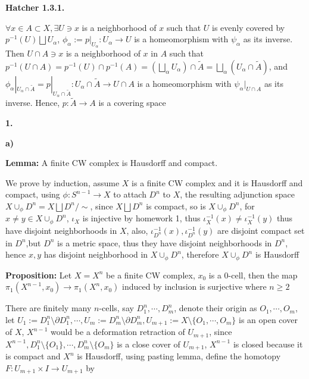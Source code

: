 \documentclass[../main.tex]{subfiles}
\begin{document}
\textbf{Hatcher 1.3.1.} \par
$\forall x\in A\subset X, \exists U\ni x$ is a neighborhood of $x$ such that $U$ is evenly covered by $p^{-1}(U)\bigsqcup U_{\alpha}$, $\phi_{\alpha}:=p|_{U_{\alpha}}:U_{\alpha}\rightarrow U$ is a homeomorphism with $\psi_{\alpha}$ as its inverse. Then $U\cap A\ni x$ is a neighborhood of $x$ in $A$ such that $\displaystyle{p^{-1}(U\cap A)=p^{-1}(U)\cap p^{-1}(A)=\left(\underset{\alpha}{\bigsqcup}U_{\alpha}\right)\cap \widetilde{A}}=\underset{\alpha}{\bigsqcup}\left(U_{\alpha}\cap \widetilde{A}\right)$, and $\phi_{\alpha}|_{U_{\alpha}\cap \widetilde{A}}=p|_{U_{\alpha}\cap \widetilde{A}}: U_{\alpha}\cap \widetilde{A}\rightarrow U\cap A$ is a homeomorphism with $\psi_{\alpha}|_{U\cap A}$ as its inverse. Hence, $p: \widetilde{A}\rightarrow A$ is a covering space \par
\textbf{1.} \par
\textbf{a)} \par
\textbf{Lemma:} A finite CW complex is Hausdorff and compact. \par
We prove by induction, assume $X$ is a finite CW complex and it is Hausdorff and compact, using $\phi: S^{n-1}\rightarrow X$ to attach $D^{n}$ to $X$, the resulting adjunction space $X\cup_{\phi}D^{n}=X\bigsqcup D^{n} /\sim$, since $X\bigsqcup D^{n}$ is compact, so is $X\cup_{\phi}D^{n}$, for $x\neq y\in X\cup_{\phi}D^{n}$, $\iota_{X}$ is injective by homework 1, thus $\iota_{X}^{-1}(x)\neq\iota_{X}^{-1}(y)$ thus have disjoint neighborhoods in $X$, also, $\iota_{D^{n}}^{-1}(x),\iota_{D^{n}}^{-1}(y)$ are disjoint compact set in $D^{n}$,but $D^{n}$ is a metric space, thus they have disjoint neighborhoods in $D^{n}$, hence $x,y$ has disjoint neighborhood in $X\cup_{\phi}D^{n}$, therefore $X\cup_{\phi}D^{n}$ is Hausdorff
\begin{center}
\end{center}
\textbf{Proposition:} Let $X=X^{n}$ be a finite CW complex, $x_{0}$ is a \(0\)-cell, then the map $\pi_{1}(X^{n-1},x_{0})\rightarrow\pi_{1}(X^{n},x_{0})$ induced by inclusion is surjective where $n\geq 2$ \par
There are finitely many $n$-cells, say $D^{n}_{1},\cdots,D^{n}_{m}$, denote their origin as $O_{1},\cdots,O_{m}$, let $U_{1}:=D^{n}_{1}\setminus\partial D^{n}_{1},\cdots,U_{m}:=D^{n}_{m}\setminus\partial D^{n}_{m},U_{m+1}:=X\setminus \{O_{1},\cdots,O_{m}\}$ is an open cover of $X$, $X^{n-1}$ would be a deformation retraction of $U_{m+1}$, since $X^{n-1},D^{n}_{1}\setminus\{O_{1}\},\cdots,D^{n}_{m}\setminus\{O_{m}\}$ is a close cover of $U_{m+1}$, $X^{n-1}$ is closed because it is compact and $X^{n}$ is Hausdorff, using pasting lemma, define the homotopy $F: U_{m+1}\times I\rightarrow U_{m+1}$ by
\end{document}
